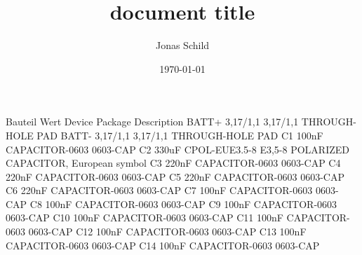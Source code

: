 \documentclass[11pt, a4paper]{article}[2009/11/13]
\title{document title}
\author{Jonas Schild}
\date{\today}
\begin{document}
\maketitle

\newpage

Bauteil Wert          Device            Package               Description                                                               
BATT+                 3,17/1,1          3,17/1,1              THROUGH-HOLE PAD                                                          
BATT-                 3,17/1,1          3,17/1,1              THROUGH-HOLE PAD                                                          
C1      100nF         CAPACITOR-0603    0603-CAP                                                                                        
C2      330uF         CPOL-EUE3.5-8     E3,5-8                POLARIZED CAPACITOR, European symbol                                      
C3      220nF         CAPACITOR-0603    0603-CAP                                                                                        
C4      220nF         CAPACITOR-0603    0603-CAP                                                                                        
C5      220nF         CAPACITOR-0603    0603-CAP                                                                                        
C6      220nF         CAPACITOR-0603    0603-CAP                                                                                        
C7      100nF         CAPACITOR-0603    0603-CAP                                                                                        
C8      100nF         CAPACITOR-0603    0603-CAP                                                                                        
C9      100nF         CAPACITOR-0603    0603-CAP                                                                                        
C10     100nF         CAPACITOR-0603    0603-CAP                                                                                        
C11     100nF         CAPACITOR-0603    0603-CAP                                                                                        
C12     100nF         CAPACITOR-0603    0603-CAP                                                                                        
C13     100nF         CAPACITOR-0603    0603-CAP                                                                                        
C14     100nF         CAPACITOR-0603    0603-CAP                                                                                        
\end{document}
